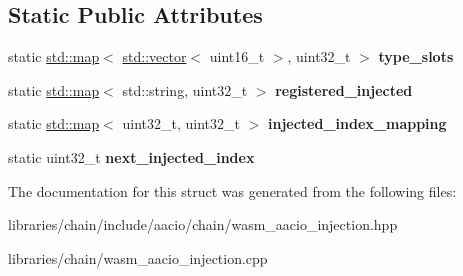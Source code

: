 \subsection*{Static Public Attributes}
\begin{DoxyCompactItemize}
\item 
\mbox{\label{structaacio_1_1chain_1_1wasm__injections_1_1injector__utils_ad8233cda9d30791972c51f36701191db}} 
static \mbox{\hyperlink{classstd_1_1map}{std\+::map}}$<$ \mbox{\hyperlink{classstd_1_1vector}{std\+::vector}}$<$ uint16\+\_\+t $>$, uint32\+\_\+t $>$ {\bfseries type\+\_\+slots}
\item 
\mbox{\label{structaacio_1_1chain_1_1wasm__injections_1_1injector__utils_aac9853fc747a2cb551dc5373aa72ceb8}} 
static \mbox{\hyperlink{classstd_1_1map}{std\+::map}}$<$ std\+::string, uint32\+\_\+t $>$ {\bfseries registered\+\_\+injected}
\item 
\mbox{\label{structaacio_1_1chain_1_1wasm__injections_1_1injector__utils_ac1c5bd583ec2d914e0cfb881c65a1113}} 
static \mbox{\hyperlink{classstd_1_1map}{std\+::map}}$<$ uint32\+\_\+t, uint32\+\_\+t $>$ {\bfseries injected\+\_\+index\+\_\+mapping}
\item 
\mbox{\label{structaacio_1_1chain_1_1wasm__injections_1_1injector__utils_af1f3eb99fc5925382fefbce7fd982860}} 
static uint32\+\_\+t {\bfseries next\+\_\+injected\+\_\+index}
\end{DoxyCompactItemize}


The documentation for this struct was generated from the following files\+:\begin{DoxyCompactItemize}
\item 
libraries/chain/include/aacio/chain/wasm\+\_\+aacio\+\_\+injection.\+hpp\item 
libraries/chain/wasm\+\_\+aacio\+\_\+injection.\+cpp\end{DoxyCompactItemize}
